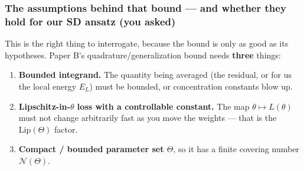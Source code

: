 \documentclass[11pt]{article}
\begin{document}
\subsubsection*{The assumptions behind that bound --- and whether they hold for our SD ansatz (you asked)}

This is the right thing to interrogate, because the bound is only as good
as its hypotheses. Paper B's quadrature/generalization bound needs \textbf{three}
things:

\begin{enumerate}
\item \textbf{Bounded integrand.} The quantity being averaged (the residual, or for
us the local energy $E_L$) must be bounded, or concentration constants
blow up.
\item \textbf{Lipschitz-in-$\theta$ loss with a controllable constant.} The map
$\theta \mapsto L(\theta)$ must not change arbitrarily fast as you move
the weights --- that is the $\mathrm{Lip}(\Theta)$ factor.
\item \textbf{Compact / bounded parameter set $\Theta$}, so it has a finite
covering number $\mathcal N(\Theta)$.
\end{enumerate}
\end{document}
